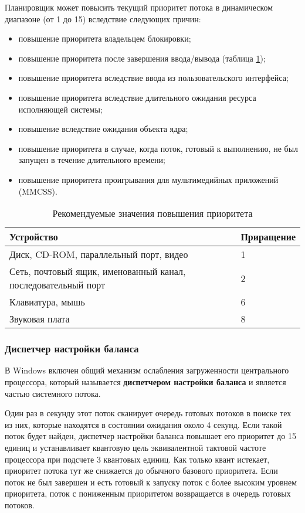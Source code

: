 Планировщик может повысить текущий приоритет потока в динамическом диапазоне (от 1 до 15) вследствие следующих причин:
\begin{itemize}[label*=---]
	\item повышение приоритета владельцем блокировки;
	\item повышение приоритета после завершения ввода/вывода (таблица \ref{tab:input-output});
	\item повышение приоритета вследствие ввода из пользовательского интерфейса;
	\item повышение приоритета вследствие длительного ожидания ресурса исполняющей системы;
	\item повышение вследствие ожидания объекта ядра;
	\item повышение приоритета в случае, когда поток, готовый к выполнению, не был запущен в течение длительного времени;
	\item повышение приоритета проигрывания для мультимедийных приложений (MMCSS). 
\end{itemize}

\begin{table}[!h]
	\caption{Рекомендуемые значения повышения приоритета}
	\begin{center}
		\begin{tabular}{|p{100mm}|l|}
			\hline
			\textbf{Устройство} & \textbf{Приращение} \\\hline
			Диск, CD-ROM, параллельный порт, видео & 1 \\ \hline
			Сеть, почтовый ящик, именованный канал, последовательный порт & 2 \\ \hline
			Клавиатура, мышь & 6 \\ \hline
			Звуковая плата & 8 \\ \hline
		\end{tabular}
	\end{center}
	\label{tab:input-output}
\end{table}

\subsubsection*{Диспетчер настройки баланса}
В Windows включен общий механизм ослабления загруженности центрального процессора, который называется \textbf{диспетчером настройки баланса} и является частью системного потока.

Один раз в секунду этот поток сканирует очередь готовых потоков в поиске тех из них, которые находятся в состоянии ожидания около 4 секунд. Если такой поток будет найден, диспетчер настройки баланса повышает его приоритет до 15 единиц и устанавливает квантовую цель эквивалентной тактовой частоте процессора при подсчете 3 квантовых единиц. Как только квант истекает, приоритет потока тут же снижается до обычного базового приоритета. Если поток не был завершен и есть готовый к запуску поток с более высоким уровнем приоритета, поток с пониженным приоритетом возвращается в очередь готовых потоков.

